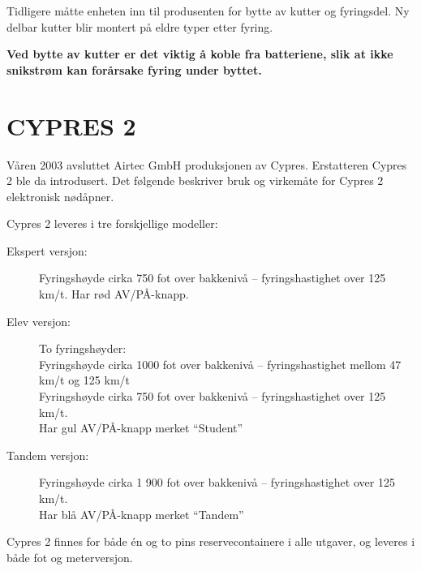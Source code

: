Tidligere måtte enheten inn til produsenten for bytte av kutter og fyringsdel. Ny delbar kutter blir montert på eldre typer etter fyring.

\textbf{Ved bytte av kutter er det viktig å koble fra batteriene, slik at ikke snikstrøm kan forårsake fyring under byttet.}

\section{CYPRES 2}
Våren 2003 avsluttet Airtec GmbH produksjonen av Cypres. Erstatteren Cypres 2 ble da introdusert. Det følgende beskriver bruk og virkemåte for Cypres 2 elektronisk nødåpner.

Cypres 2 leveres i tre forskjellige modeller:
\begin{description}
\item[Ekspert versjon:] Fyringshøyde cirka 750 fot over bakkenivå – fyringshastighet over 125 km/t. Har rød AV/PÅ-knapp.
\item[Elev versjon:] To fyringshøyder: \\
Fyringshøyde cirka 1000 fot over bakkenivå – fyringshastighet mellom 47 km/t og 125 km/t \\
Fyringshøyde cirka 750 fot over bakkenivå – fyringshastighet over 125 km/t. \\
Har gul AV/PÅ-knapp merket ``Student''

\item[Tandem versjon:] Fyringshøyde cirka 1 900 fot over bakkenivå – fyringshastighet over 125 km/t. \\
Har blå AV/PÅ-knapp merket ``Tandem''
\end{description}

Cypres 2 finnes for både én og to pins reservecontainere i alle utgaver, og leveres i både fot og meterversjon.


